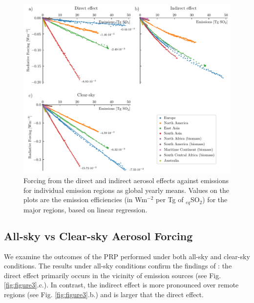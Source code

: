 \documentclass[draft]{agujournal2019}
\begin{document}
      \begin{figure}
            \centering
            \includegraphics[width=\textwidth]{../../figures/figure2}
            \caption{Forcing from the direct and indirect aerosol effects against emissions for individual emission regions as global yearly means. Values on the plots are the emission efficiencies (in Wm$^{-2}$ per Tg of $_{eq}$SO$_2$) for the major regions, based on linear regression.}
      \label{fig:figure2}
      \end{figure}

      \subsection{All-sky vs Clear-sky Aerosol Forcing}
            We examine the outcomes of the PRP performed under both all-sky and clear-sky conditions. The results under all-sky conditions confirm the findings of : the direct effect primarily occurs in the vicinity of emission sources (see Fig. \ref{fig:figure3}.c.). In contrast, the indirect effect is more pronounced over remote regions (see Fig. \ref{fig:figure3}.b.) and is larger that the direct effect.
            
\end{document}

